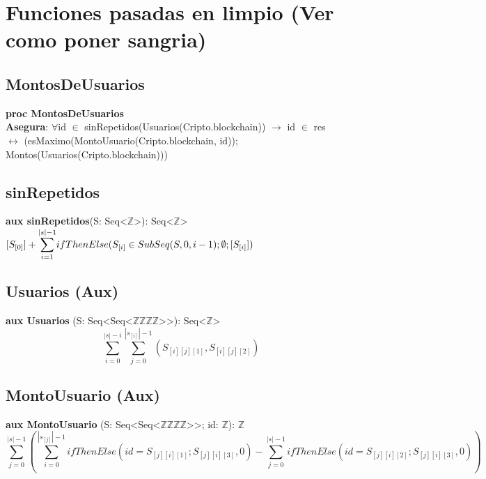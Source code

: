\documentclass{article}
\begin{document}
\newpage %


\section{Funciones pasadas en limpio (Ver como poner sangria)}
\subsection{MontosDeUsuarios}


\textbf{proc MontosDeUsuarios} \\
\textbf{Asegura}: $\forall$id $\in$ sinRepetidos(Usuarios(Cripto.blockchain)) $\rightarrow$ id $\in$ res \\
$\longleftrightarrow$ (esMaximo(MontoUsuario(Cripto.blockchain, id)); Montos(Usuarios(Cripto.blockchain)))


\subsection{sinRepetidos}
\textbf{aux sinRepetidos}(S: Seq\textless$\mathds{Z}$\textgreater): Seq\textless$\mathds{Z}$\textgreater \\
$[S_{[0]}] + \mathlarger\sum\limits_{i=1}^{|s|-1} ifThenElse(S_{[i]} \in SubSeq(S, 0, i-1); \emptyset; [S_{[i]}])$


\subsection{Usuarios (Aux)}
\textbf{aux Usuarios} (S: Seq\textless Seq\textless $\mathds{Z}$\texttimes$\mathds{Z}$\texttimes$\mathds{Z}$\texttimes$\mathds{Z}$\textgreater\textgreater): Seq\textless$\mathds{Z}$\textgreater \\
\[
\sum\limits_{i=0}^{|s|-i} \sum\limits_{j=0}^{|s_{[i]}|-1} \left( S_{[i][j][1]}, S_{[i][j][2]} \right)
\]


\subsection{MontoUsuario (Aux)}
\textbf{aux MontoUsuario} (S: Seq\textless Seq\textless $\mathds{Z}$\texttimes$\mathds{Z}$\texttimes$\mathds{Z}$\texttimes$\mathds{Z}$\textgreater\textgreater; id: $\mathds{Z}$): $\mathds{Z}$ \\
\[
\sum\limits_{j=0}^{|s|-1} \left( \sum\limits_{i=0}^{|s_{[j]}|-1} 
ifThenElse(id = S_{[j][i][1]}; S_{[j][i][3]}, 0) 
- \sum\limits_{j=0}^{|s|-1} ifThenElse(id = S_{[j][i][2]}; S_{[j][i][3]}, 0) \right)
\]
\end{document}
